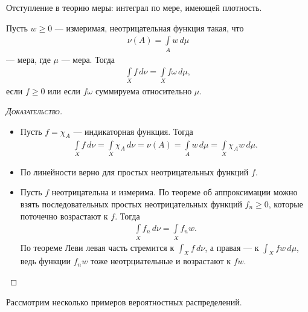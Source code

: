 
Отступление в теорию меры: интеграл по мере, имеющей плотность.

\begin{thm}[%
]
 Пусть $ w \geqslant 0 $ --- измеримая, неотрицательная функция такая, что
 \begin{align*}
  \nu(A) = \int\limits_{A} w\,d\mu 
 \end{align*} --- мера, где $ \mu $ --- мера. Тогда
 \begin{align*}
  \int\limits_{X} f\,d\nu = \int\limits_{X} f \omega \, d\mu,
 \end{align*} если $ f \geqslant 0 $ или если $ f\omega $ суммируема относительно $ \mu $.
\end{thm}
\begin{proof}[\normalfont\textsc{Доказательство}]\
 \begin{itemize}
  \item Пусть $ f = \chi_A $ --- индикаторная функция. Тогда
   \begin{align*}
    \int\limits_{X} f\, d\nu = \int\limits_{X} \chi_A \, d\nu = \nu(A) = \int\limits_{A} w\,d\mu = \int\limits_{X} \chi_A w\,d\mu.    
   \end{align*} 
  \item По линейности верно для простых неотрицательных функций $ f $.
  \item Пусть $ f $ неотрицательна и измерима. По теореме об аппроксимации можно взять последовательных простых неотрицательных функций $ f_n \geqslant 0 $, которые поточечно возрастают к $ f $. Тогда
   \begin{align*}
    \int\limits_{X} f_n \,d\nu = \int\limits_{X} f_n w.  
   \end{align*} По теореме Леви левая часть стремится к $ \int_{X} f\,d\nu  $, а правая --- к $ \int_{X} fw\,d\mu $, ведь функции $ f_nw $ тоже неотрциательные и возрастают к $ fw $.
 \end{itemize}
\end{proof}

Рассмотрим несколько примеров вероятностных распределений.


